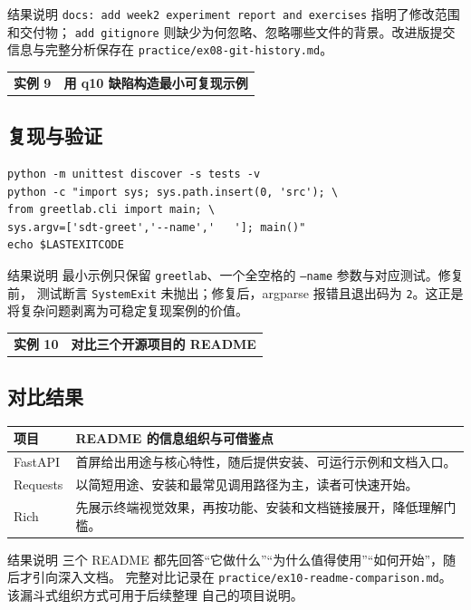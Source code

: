 \documentclass[UTF8,zihao=-4]{ctexart}
\newcommand{\practicebanner}[2]{
  \begin{tcolorbox}[
    colback=soft,
    colframe=navy,
    boxrule=1pt,
    arc=2mm,
    left=4mm,right=4mm,top=2.5mm,bottom=2.5mm]
    \begin{tabularx}{\textwidth}{>{\Large\bfseries\color{navy}}p{2.7cm}X}
      实例 #1 & {\large\bfseries\color{navy}#2}
    \end{tabularx}
  \end{tcolorbox}
}
\begin{document}
\begin{summarybox}{结果说明}
\texttt{docs: add week2 experiment report and exercises} 指明了修改范围和交付物；
\texttt{add gitignore} 则缺少为何忽略、忽略哪些文件的背景。改进版提交信息与完整分析保存在
\texttt{practice/ex08-git-history.md}。
\end{summarybox}

\clearpage
\practicebanner{9}{用 q10 缺陷构造最小可复现示例}

\subsection*{复现与验证}
\begin{lstlisting}[style=shell]
python -m unittest discover -s tests -v
python -c "import sys; sys.path.insert(0, 'src'); \
from greetlab.cli import main; \
sys.argv=['sdt-greet','--name','   ']; main()"
echo $LASTEXITCODE
\end{lstlisting}

\begin{summarybox}{结果说明}
最小示例只保留 \texttt{greetlab}、一个全空格的 \texttt{--name} 参数与对应测试。修复前，
测试断言 \texttt{SystemExit} 未抛出；修复后，argparse 报错且退出码为 \texttt{2}。这正是
将复杂问题剥离为可稳定复现案例的价值。
\end{summarybox}

\practicebanner{10}{对比三个开源项目的 README}

\subsection*{对比结果}
\begin{table}[H]
  \centering
  \renewcommand{\arraystretch}{1.30}
  \begin{tabularx}{\textwidth}{p{2.0cm}X}
    \toprule
    项目 & README 的信息组织与可借鉴点 \\
    \midrule
    FastAPI & 首屏给出用途与核心特性，随后提供安装、可运行示例和文档入口。 \\
    Requests & 以简短用途、安装和最常见调用路径为主，读者可快速开始。 \\
    Rich & 先展示终端视觉效果，再按功能、安装和文档链接展开，降低理解门槛。 \\
    \bottomrule
  \end{tabularx}
\end{table}

\begin{summarybox}{结果说明}
三个 README 都先回答“它做什么”“为什么值得使用”“如何开始”，随后才引向深入文档。
完整对比记录在 \texttt{practice/ex10-readme-comparison.md}。该漏斗式组织方式可用于后续整理
自己的项目说明。
\end{summarybox}
\end{document}
